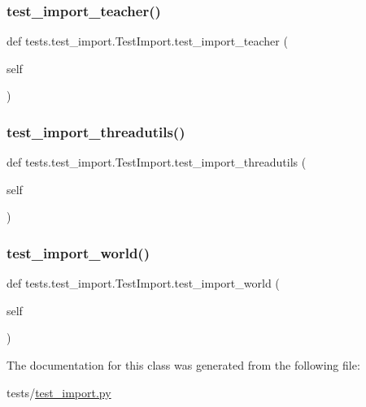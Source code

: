 \subsubsection{\texorpdfstring{test\+\_\+import\+\_\+teacher()}{test\_import\_teacher()}}
{\footnotesize\ttfamily def tests.\+test\+\_\+import.\+Test\+Import.\+test\+\_\+import\+\_\+teacher (\begin{DoxyParamCaption}\item[{}]{self }\end{DoxyParamCaption})}

\mbox{\label{classtests_1_1test__import_1_1TestImport_a3a90634703bb67d0bb0b3ac5352657ad}} 
\subsubsection{\texorpdfstring{test\+\_\+import\+\_\+threadutils()}{test\_import\_threadutils()}}
{\footnotesize\ttfamily def tests.\+test\+\_\+import.\+Test\+Import.\+test\+\_\+import\+\_\+threadutils (\begin{DoxyParamCaption}\item[{}]{self }\end{DoxyParamCaption})}

\mbox{\label{classtests_1_1test__import_1_1TestImport_a7eb4091dcd3395e147659ec3a49be488}} 
\subsubsection{\texorpdfstring{test\+\_\+import\+\_\+world()}{test\_import\_world()}}
{\footnotesize\ttfamily def tests.\+test\+\_\+import.\+Test\+Import.\+test\+\_\+import\+\_\+world (\begin{DoxyParamCaption}\item[{}]{self }\end{DoxyParamCaption})}



The documentation for this class was generated from the following file\+:\begin{DoxyCompactItemize}
\item 
tests/\hyperlink{test__import_8py}{test\+\_\+import.\+py}\end{DoxyCompactItemize}
